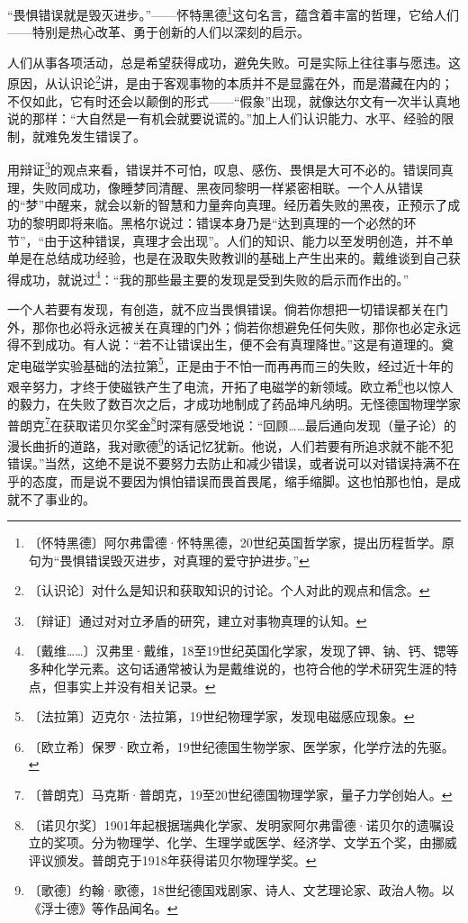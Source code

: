 \documentclass[12pt,UTF-8,openany]{ctexbook}
\begin{document}
\begin{normalsize}
    
    “畏惧错误就是毁灭进步。”——怀特黑德\footnote{〔怀特黑德〕阿尔弗雷德·怀特黑德，20世纪英国哲学家，提出历程哲学。原句为“畏惧错误毁灭进步，对真理的爱守护进步。”}这句名言，蕴含着丰富的哲理，它给人们——特别是热心改革、勇于创新的人们以深刻的启示。
    
    人们从事各项活动，总是希望获得成功，避免失败。可是实际上往往事与愿违。这原因，从认识论\footnote{〔认识论〕对什么是知识和获取知识的讨论。个人对此的观点和信念。}讲，是由于客观事物的本质并不是显露在外，而是潜藏在内的；不仅如此，它有时还会以颠倒的形式——“假象”出现，就像达尔文有一次半认真地说的那样：“大自然是一有机会就要说谎的。”加上人们认识能力、水平、经验的限制，就难免发生错误了。
    
    用辩证\footnote{〔辩证〕通过对对立矛盾的研究，建立对事物真理的认知。}的观点来看，错误并不可怕，叹息、感伤、畏惧是大可不必的。错误同真理，失败同成功，像睡梦同清醒、黑夜同黎明一样紧密相联。一个人从错误的“梦”中醒来，就会以新的智慧和力量奔向真理。经历着失败的黑夜，正预示了成功的黎明即将来临。黑格尔说过：错误本身乃是“达到真理的一个必然的环节”，“由于这种错误，真理才会出现”。人们的知识、能力以至发明创造，并不单单是在总结成功经验，也是在汲取失败教训的基础上产生出来的。戴维谈到自己获得成功，就说过\footnote{〔戴维……〕汉弗里·戴维，18至19世纪英国化学家，发现了钾、钠、钙、锶等多种化学元素。这句话通常被认为是戴维说的，也符合他的学术研究生涯的特点，但事实上并没有相关记录。}：“我的那些最主要的发现是受到失败的启示而作出的。”
    
    一个人若要有发现，有创造，就不应当畏惧错误。倘若你想把一切错误都关在门外，那你也必将永远被关在真理的门外；倘若你想避免任何失败，那你也必定永远得不到成功。有人说：“若不让错误出生，便不会有真理降世。”这是有道理的。奠定电磁学实验基础的法拉第\footnote{〔法拉第〕迈克尔·法拉第，19世纪物理学家，发现电磁感应现象。}，正是由于不怕一而再再而三的失败，经过近十年的艰辛努力，才终于使磁铁产生了电流，开拓了电磁学的新领域。欧立希\footnote{〔欧立希〕保罗·欧立希，19世纪德国生物学家、医学家，化学疗法的先驱。}也以惊人的毅力，在失败了数百次之后，才成功地制成了药品坤凡纳明。无怪德国物理学家普朗克\footnote{〔普朗克〕马克斯·普朗克，19至20世纪德国物理学家，量子力学创始人。}在获取诺贝尔奖金\footnote{〔诺贝尔奖〕1901年起根据瑞典化学家、发明家阿尔弗雷德·诺贝尔的遗嘱设立的奖项。分为物理学、化学、生理学或医学、经济学、文学五个奖，由挪威评议颁发。普朗克于1918年获得诺贝尔物理学奖。}时深有感受地说：“回顾……最后通向发现（量子论）的漫长曲折的道路，我对歌德\footnote{〔歌德〕约翰·歌德，18世纪德国戏剧家、诗人、文艺理论家、政治人物。以《浮士德》等作品闻名。}的话记忆犹新。他说，人们若要有所追求就不能不犯错误。”当然，这绝不是说不要努力去防止和减少错误，或者说可以对错误持满不在乎的态度，而是说不要因为惧怕错误而畏首畏尾，缩手缩脚。这也怕那也怕，是成就不了事业的。
    

\end{normalsize}
\end{document}
